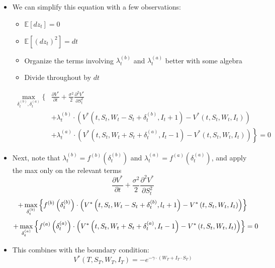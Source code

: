 \documentclass[10pt]{article}
\begin{document}
\begin{itemize} 
    \item We can simplify this equation with a few observations:
    \begin{itemize} 
        \item $\mathbb{E}\left[d z_{t}\right]=0$
        \item $\mathbb{E}\left[\left(d z_{t}\right)^{2}\right]=d t$
        \item Organize the terms involving $\lambda_{t}^{(b)}$ and $\lambda_{t}^{(a)}$ better with some algebra
        \item Divide throughout by $dt$
    \end{itemize}
    $$
    \begin{aligned} \max _{\delta_{t}^{(b)}, \delta_{t}^{(a)}}\{& \frac{\partial V^{*}}{\partial t}+\frac{\sigma^{2}}{2} \frac{\partial^{2} V^{*}}{\partial S_{t}^{2}} \\ &+\lambda_{t}^{(b)} \cdot\left(V^{*}\left(t, S_{t}, W_{t}-S_{t}+\delta_{t}^{(b)}, I_{t}+1\right)-V^{*}\left(t, S_{t}, W_{t}, I_{t}\right)\right) \\ & \left.+\lambda_{t}^{(a)} \cdot\left(V^{*}\left(t, S_{t}, W_{t}+S_{t}+\delta_{t}^{(a)}, I_{t}-1\right)-V^{*}\left(t, S_{t}, W_{t}, I_{t}\right)\right)\right\}=0 \end{aligned}
    $$
\end{itemize}

\begin{itemize} 
    \item Next, note that $\lambda_{t}^{(b)}=f^{(b)}\left(\delta_{t}^{(b)}\right)$ and $\lambda_{t}^{(a)}=f^{(a)}\left(\delta_{t}^{(a)}\right)$, and apply the max
    only on the relevant terms
    $$
    \frac{\partial V^{*}}{\partial t}+\frac{\sigma^{2}}{2} \frac{\partial^{2} V^{*}}{\partial S_{t}^{2}}
    $$
    $$
    +\max _{\delta_{t}^{(b)}}\left\{f^{(b)}\left(\delta_{t}^{(b)}\right) \cdot\left(V^{*}\left(t, S_{t}, W_{t}-S_{t}+\delta_{t}^{(b)}, l_{t}+1\right)-V^{*}\left(t, S_{t}, W_{t}, I_{t}\right)\right)\right\}\\
    $$
    $$
    +\max _{\delta_{t}^{(a)}}\left\{f^{(a)}\left(\delta_{t}^{(a)}\right) \cdot\left(V^{*}\left(t, S_{t}, W_{t}+S_{t}+\delta_{t}^{(a)}, I_{t}-1\right)-V^{*}\left(t, S_{t}, W_{t}, I_{t}\right)\right)\right\}=0\\
    $$
    \item This combines with the boundary condition:
    $$
    V^{*}\left(T, S_{T}, W_{T}, I_{T}\right)=-e^{-\gamma \cdot\left(W_{T}+I_{T} \cdot S_{T}\right)}
    $$
\end{itemize}
\end{document}
